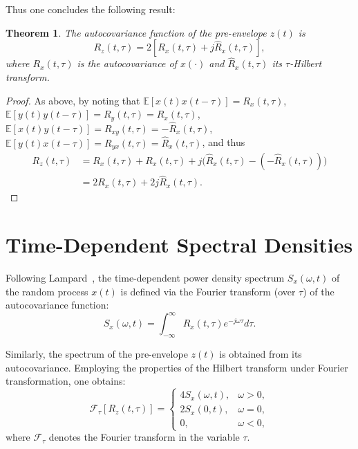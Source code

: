 \documentclass[12pt]{article}
\newtheorem{theorem}{Theorem}[section]
\begin{document}
Thus one concludes the following result:
\begin{theorem}
\label{thm:preenvelope_covariance}
The autocovariance function of the pre-envelope $z(t)$ is
\begin{equation}
R_z(t, \tau) = 2 \left[ R_x(t, \tau) + j \hat{R}_x(t, \tau) \right],
\label{eq:preenvelope_autocov}
\end{equation}
where $R_x(t, \tau)$ is the autocovariance of $x(\cdot)$ and $\hat{R}_x(t, \tau)$ its $\tau$-Hilbert transform.
\end{theorem}
\begin{proof}
As above, by noting that $\mathbb{E}[x(t)x(t-\tau)] = R_x(t,\tau)$,
$\mathbb{E}[y(t)y(t-\tau)] = R_y(t,\tau) = R_x(t,\tau)$,
$\mathbb{E}[x(t)y(t-\tau)] = R_{xy}(t,\tau) = -\hat{R}_x(t,\tau)$,
$\mathbb{E}[y(t)x(t-\tau)] = R_{yx}(t,\tau) = \hat{R}_x(t,\tau)$,
and thus
\begin{align*}
R_z(t,\tau) &=  R_x(t,\tau) + R_x(t,\tau) + j \big(\hat{R}_x(t,\tau) - (-\hat{R}_x(t,\tau))\big) \\
&= 2 R_x(t,\tau) + 2j \hat{R}_x(t,\tau).
\end{align*}
\end{proof}

\section{Time-Dependent Spectral Densities}
Following Lampard~\cite{lampard1954}, the time-dependent power density spectrum $S_x(\omega, t)$ of the random process $x(t)$ is defined via the Fourier transform (over $\tau$) of the autocovariance function:
\begin{equation}
S_x(\omega, t) = \int_{-\infty}^{\infty} R_x(t, \tau) e^{-j\omega\tau} d\tau.
\label{eq:tdspectrum}
\end{equation}

Similarly, the spectrum of the pre-envelope $z(t)$ is obtained from its autocovariance. Employing the properties of the Hilbert transform under Fourier transformation, one obtains:
\begin{equation}
\mathcal{F}_\tau[R_z(t, \tau)] =
\begin{cases}
4 S_x(\omega, t), & \omega > 0, \\
2 S_x(0, t), & \omega = 0, \\
0, & \omega < 0,
\end{cases}
\label{eq:preenvelope_spectrum}
\end{equation}
where $\mathcal{F}_\tau$ denotes the Fourier transform in the variable $\tau$.
\end{document}

